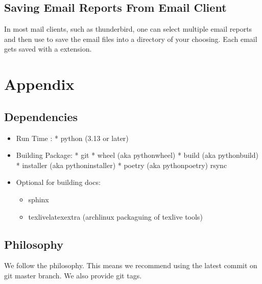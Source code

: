 \documentclass[letterpaper,10pt,english]{sphinxmanual}
\begin{document}
\section{Saving Email Reports From Email Client}
\label{\detokenize{README:saving-email-reports-from-email-client}}
\sphinxAtStartPar
In most mail clients, such as thunderbird,  one can select multiple email reports and
then use  to save the email files into a directory of your choosing.
Each email gets saved with a  extension.


\chapter{Appendix}
\label{\detokenize{README:appendix}}

\section{Dependencies}
\label{\detokenize{README:dependencies}}\begin{itemize}
\item {} 
\sphinxAtStartPar
Run Time :
* python (3.13 or later)

\item {} 
\sphinxAtStartPar
Building Package:
* git
* wheel (aka python\sphinxhyphen{}wheel)
* build (aka python\sphinxhyphen{}build)
* installer (aka python\sphinxhyphen{}installer)
* poetry (aka python\sphinxhyphen{}poetry)
\sphinxhyphen{} rsync

\item {} 
\sphinxAtStartPar
Optional for building docs:
\begin{itemize}
\item {} 
\sphinxAtStartPar
sphinx

\item {} 
\sphinxAtStartPar
texlive\sphinxhyphen{}latexextra  (archlinux packaguing of texlive tools)

\end{itemize}

\end{itemize}


\section{Philosophy}
\label{\detokenize{README:philosophy}}
\sphinxAtStartPar
We follow the  philosophy. This means we recommend using the
latest commit on git master branch. We also provide git tags.
\end{document}

